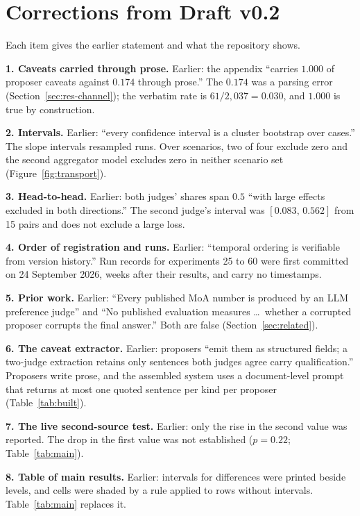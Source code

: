 \documentclass[10pt,twocolumn]{article}
\newcommand{\ci}[2]{\ensuremath{[#1,\,#2]}}
\begin{document}
\appendix

\section{Corrections from Draft v0.2}
\label{app:corrections}

Each item gives the earlier statement and what the repository shows.

\textbf{1. Caveats carried through prose.} Earlier: the appendix
``carries $1.000$ of proposer caveats against $0.174$ through prose.''
The $0.174$ was a parsing error (Section~\ref{sec:res-channel}); the
verbatim rate is $61/2{,}037 = 0.030$, and $1.000$ is true by
construction.

\textbf{2. Intervals.} Earlier: ``every confidence interval is a
cluster bootstrap over cases.'' The slope intervals resampled runs.
Over scenarios, two of four exclude zero and the second aggregator
model excludes zero in neither scenario set
(Figure~\ref{fig:transport}).

\textbf{3. Head-to-head.} Earlier: both judges' shares span $0.5$
``with large effects excluded in both directions.'' The second judge's
interval was \ci{0.083}{0.562} from 15 pairs and does not exclude a
large loss.

\textbf{4. Order of registration and runs.} Earlier: ``temporal
ordering is verifiable from version history.'' Run records for
experiments 25 to 60 were first committed on 24 September 2026, weeks
after their results, and carry no timestamps.

\textbf{5. Prior work.} Earlier: ``Every published MoA number is
produced by an LLM preference judge'' and ``No published evaluation
measures \ldots\ whether a corrupted proposer corrupts the final
answer.'' Both are false (Section~\ref{sec:related}).

\textbf{6. The caveat extractor.} Earlier: proposers ``emit them as
structured fields; a two-judge extraction retains only sentences both
judges agree carry qualification.'' Proposers write prose, and the
assembled system uses a document-level prompt that returns at most one
quoted sentence per kind per proposer (Table~\ref{tab:built}).

\textbf{7. The live second-source test.} Earlier: only the rise in the
second value was reported. The drop in the first value was not
established ($p=0.22$; Table~\ref{tab:main}).

\textbf{8. Table of main results.} Earlier: intervals for differences
were printed beside levels, and cells were shaded by a rule applied to
rows without intervals. Table~\ref{tab:main} replaces it.
\end{document}
